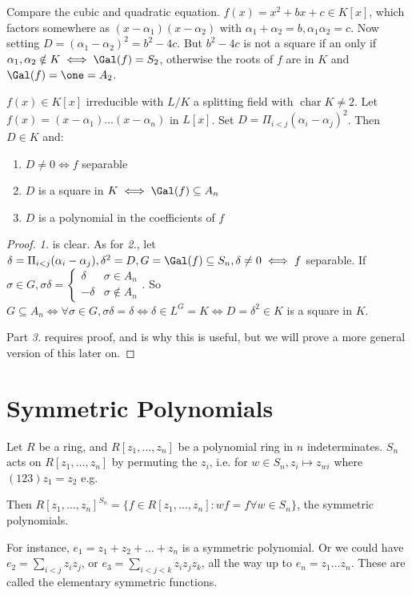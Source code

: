 \documentclass[a4paper, 10pt, twocolumn]{amsart}
\renewcommand{\charr}{\operatorname{char}}
\begin{document}
Compare the cubic and quadratic equation. $f(x) = x^2 + bx + c \in K[x]$, which factors somewhere as $(x-\alpha_1)(x-\alpha_2)$ with $\alpha_1+\alpha_2 = b, \alpha_1\alpha_2 = c$. Now setting $D = (\alpha_1-\alpha_2)^2 = b^2-4c$. But $b^2-4c$ is not a square if an only if $\alpha_1, \alpha_2 \notin K \iff \Gal(f) = S_2$, otherwise the roots of $f$ are in $K$ and $\Gal(f) = \one = A_2$.

\begin{proposition}
$f(x) \in K[x]$ irreducible with $L/K$ a splitting field with $\charr K \neq 2$. Let $f(x) = (x-\alpha_1)\ldots(x-\alpha_n)$ in $L[x]$. Set $D = \Pi_{i<j} (\alpha_i - \alpha_j)^2$. Then $D \in K$ and:
\begin{enumerate}
\item $D \neq 0 \iff f$ separable
\item $D$ is a square in $K \iff \Gal(f) \subseteq A_n$
\item $D$ is a polynomial in the coefficients of $f$
\end{enumerate}
\end{proposition}
\begin{proof}
\textit{1.} is clear. As for \textit{2.}, let $\delta = \Pi_{i<j}(\alpha_i -\alpha_j), \delta^2 = D, G = \Gal(f) \subseteq S_n, \delta \neq 0 \iff f$ separable. If $\sigma \in G, \sigma \delta = \begin{cases} \delta & \sigma \in A_n \\ -\delta & \sigma \notin A_n \end{cases}$. So $G \subseteq A_n \iff \forall \sigma \in G, \sigma \delta = \delta \iff \delta \in L^G = K \iff D = \delta^2 \in K$ is a square in $K$.

Part \textit{3.} requires proof, and is why this is useful, but we will prove a more general version of this later on.
\end{proof}
\section{Symmetric Polynomials}
Let $R$ be a ring, and $R[z_1, \ldots, z_n]$ be a polynomial ring in $n$ indeterminates. $S_n$ acts on $R[z_1, \ldots, z_n]$ by permuting the $z_i$, i.e. for $w \in S_n, z_i \mapsto z_{wi}$ where $(123)z_1 = z_2$ e.g.

Then $R[z_1, \ldots, z_n]^{S_n} = \{f \in R[z_1, \ldots, z_n] : wf = f \forall w \in S_n\}$, the symmetric polynomials. 

For instance, $e_1 = z_1 + z_2 + \ldots + z_n$ is a symmetric polynomial. Or we could have $e_2 = \sum_{i<j} z_i z_j$, or $e_3 = \sum_{i<j<k} z_i z_j z_k$, all the way up to $e_n = z_1\ldots z_n$. These are called the elementary symmetric functions.
\end{document}

